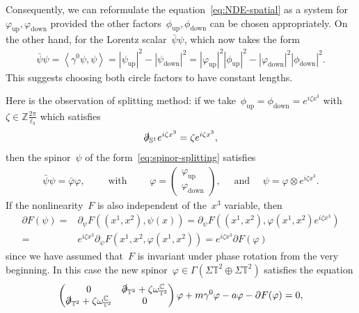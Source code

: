 \documentclass[11pt,final]{amsart}
\newcommand{\p}{\partial}
\newcommand{\C}{\mathbb{C}}
\newcommand{\T}{\mathbb{T}}
\newcommand{\pd}{\slashed{\partial}}
\newcommand{\sph}{\mathbb{S}}
\newcommand{\Abracket}[1]{\left<#1\right>} %
\DeclareMathOperator{\up}{up}
\DeclareMathOperator{\down}{down}
\begin{document}
Consequently, we can reformulate the equation~\eqref{eq:NDE-spatial} as a system for~$\varphi_{\up},\varphi_{\down}$ provided the other factors~$\phi_{\up},\phi_{\down}$ can be chosen appropriately. 
On the other hand, for the Lorentz scalar~$\bar{\psi}\psi$, which now takes the form 
\begin{align}
    \bar{\psi}\psi=\Abracket{\gamma^0\psi,\psi}
    =|\psi_{\up}|^2 - |\psi_{\down}|^2
    =|\varphi_{\up}|^2 |\phi_{\up}|^2
     - |\varphi_{\down}|^2 |\phi_{\down}|^2.
\end{align}
This suggests choosing both circle factors to have constant lengths. 

Here is the observation of splitting method: if we take~$\phi_{\up}=\phi_{\down}=e^{i \zeta x^3}$ with~$\zeta\in\mathbb{Z}\frac{2\pi}{\ell_3}$ which satisfies 
\begin{align}
    \pd_{\sph^1} e^{i\zeta x^3}= \zeta e^{i\zeta x^3},
\end{align}
then the spinor~$\psi$ of the form~\eqref{eq:spinor-splitting} satisfies 
\begin{align}
    \bar{\psi}\psi=\bar{\varphi}\varphi, 
    \qquad \mbox{ with } 
    \qquad 
    \varphi 
    = \begin{pmatrix}
    \varphi_{\up} \\ \varphi_{\down}
    \end{pmatrix}, 
    \quad \mbox{ and } \quad 
    \psi=\varphi\otimes e^{i\zeta x^3
    }.
\end{align}
If the nonlinearity~$F$ is also independent of the~$x^3$ variable, then 
\begin{align}
    \p F(\psi) 
    =& \p_\psi F((x^1,x^2), \psi(x)) 
    = \p_\psi F((x^1,x^2),\varphi(x^1,x^2) e^{i\zeta x^3} )\\
    =& e^{i\zeta x^3}\p_\psi F(x^1,x^2,\varphi(x^1,x^2))
    = e^{i\zeta x^3}\p F(\varphi)
\end{align}
since we have assumed that~$F$ is invariant under phase rotation from the very beginning. 
In this case the new spinor~$\varphi\in \Gamma(\Sigma \T^2\oplus \Sigma \T^2)$ satisfies the equation 
\begin{align}
    \begin{pmatrix}
        0 & \pd_{\T^2} + \zeta \omega_{\T^2}^{\C} \\ \pd_{\T^2}+ \zeta \omega_{\T^2}^{\C} & 0
    \end{pmatrix}\varphi 
    + m\gamma^0\varphi - a\varphi -\p F(\varphi)=0, 
\end{align}
\end{document}
